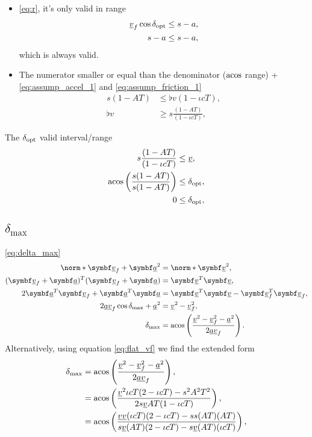 \begin{itemize}
\item
\eqref{eq:r}, it's only valid in range
\begin{align*}
\flat{v}_f \cos\delta_{\opt} &\le s - a,\\
s - a&\le s - a,
\end{align*}
which is always valid.

\item
The numerator smaller or equal than the denominator ($\operatorname{acos}$ range) + \eqref{eq:assump_accel_1} and \eqref{eq:assump_friction_1}
\begin{align*}
s (1 - AT) &\le \flat{v}(1 - \iota cT),\\
\flat{v} &\ge s \frac{(1 - AT)}{(1 - \iota cT)},
\end{align*}
\end{itemize}

The $\delta_{\operatorname{opt}}$ valid interval/range
\begin{align*}
s \frac{(1 - AT)}{(1 - \iota cT)} &\le \flat{v},\\
\acos\left( \frac{s(1 - AT)}{s(1 - AT)} \right) &\le \delta_{\opt},\\
0 &\le \delta_{\opt},
\end{align*}


\subsection{\texorpdfstring{$\delta_{\max}$}{delta\_max}}
\eqref{eq:delta_max}
\begin{align*}
\norm*{\vec{\flat{v}}_f + \vec{\flat{a}}}^2 &= \norm*{\vec{\flat{v}}}^2,\\
(\vec{\flat{v}}_f + \vec{\flat{a}})^T (\vec{\flat{v}}_f + \vec{\flat{a}}) &= \vec{\flat{v}}^T \vec{\flat{v}},\\
2 \vec{\flat{a}}^T \vec{\flat{v}}_f + \vec{\flat{a}}^T \vec{\flat{a}} &= \vec{\flat{v}}^T \vec{\flat{v}} - \vec{\flat{v}}_f^T \vec{\flat{v}}_f,\\
2 \flat{a} \flat{v}_f \cos\delta_{\max} + \flat{a}^2 &= \flat{v}^2 - \flat{v}_f^2,\\
\delta_{\max} &= \acos\left( \frac{\flat{v}^2 - \flat{v}_f^2 - \flat{a}^2}{2 \flat{a} \flat{v}_f} \right).
\end{align*}
Alternatively, using equation \eqref{eq:flat_vf} we find the extended form
\begin{align*}
\delta_{\max} &= \acos\left( \frac{\flat{v}^2 - \flat{v}_f^2 - \flat{a}^2}{2 \flat{a} \flat{v}_f} \right),\\
&= \acos\left( \frac{\flat{v}^2 \iota cT(2 - \iota cT) - s^2 A^2 T^2}{2 s \flat{v} AT(1 - \iota cT)} \right),\\
&= \acos\left( \frac{\flat{v} \flat{v} (\iota cT)(2 - \iota cT) - ss (AT)(AT)}{s \flat{v} (AT)(2 - \iota cT) - s \flat{v} (AT)(\iota cT)} \right),
\end{align*}

